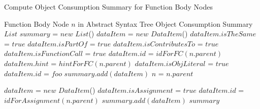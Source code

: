 \documentclass[10pt, preprint]{sigplanconf}
\begin{document}




\renewcommand{\algorithmicrequire}{\textbf{Input:}}
\renewcommand{\algorithmicensure}{\textbf{Output:}}

\begin{algorithm}                      %
\caption{Compute Object Consumption Summary for Function Body Nodes}          %
\label{alg1}                           %
\begin{algorithmic}                    %
\REQUIRE Function Body Node $n$ in Abstract Syntax Tree
\ENSURE Object Consumption Summary 
\STATE $List$ $summary$ = $new$ $List$()
	\STATE $dataItem$ = $new$ $DataItem$()
    	 \STATE $dataItem.isTheSame$ = $true$
    		\STATE $dataItem.isPartOf$ = $true$
    \ELSE	
	   		\STATE $dataItem.isContributesTo$ = $true$
    \ENDIF
   	    \STATE $dataItem.isFunctionCall$ = $true$
   	    \STATE $dataItem.id$ = $idForFC(n.parent)$
   	    \STATE $dataItem.hint$ = $hintForFC(n.parent)$
   	    \STATE $dataItem.isObjLiteral$ = $true$
   	    \STATE $dataItem.id$ = $foo$
    \ENDIF     
   \STATE $summary.add(dataItem)$
   \STATE $n$ = $n.parent$
\ENDWHILE 
 
  	\STATE $dataItem$ = $new$ $DataItem$()
		\STATE $dataItem.isAssignment$ = $true$
    \STATE $dataItem.id$ = $idForAssignment(n.parent)$
    \STATE $summary.add(dataItem)$
  \ENDIF	
  \RETURN $summary$
\end{algorithmic}
\end{algorithm}
\end{document}
